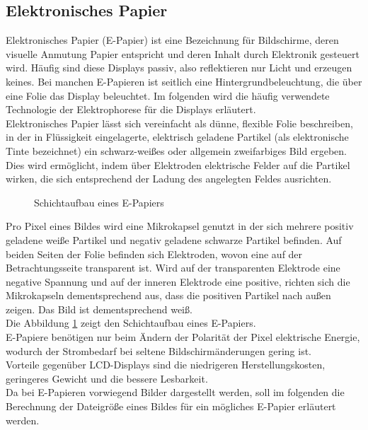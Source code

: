 \subsection{Elektronisches Papier}
Elektronisches Papier (E-Papier) ist eine Bezeichnung für Bildschirme, deren visuelle Anmutung Papier entspricht und deren Inhalt durch Elektronik gesteuert wird. Häufig sind diese Displays passiv, also reflektieren nur Licht und erzeugen keines. Bei manchen E-Papieren ist seitlich eine Hintergrundbeleuchtung, die über eine Folie das Display beleuchtet. Im folgenden wird die häufig verwendete Technologie der Elektrophorese für die Displays erläutert. \\
\glqq Elektronisches Papier lässt sich vereinfacht als dünne, flexible Folie beschreiben, in der in Flüssigkeit eingelagerte, elektrisch geladene Partikel (als elektronische Tinte bezeichnet) ein schwarz-weißes oder allgemein zweifarbiges Bild ergeben. Dies wird ermöglicht, indem über Elektroden elektrische Felder auf die Partikel wirken, die sich entsprechend der Ladung des angelegten Feldes ausrichten. \grqq{} \cite[Seite 568]{Schryen.2002} \\
\begin{figure}[hbt]
	\centering
	
	\caption[Schichtaufbau eines E-Papiers]{Schichtaufbau eines E-Papiers}
	\label{fig:epapier}
\end{figure}
Pro Pixel eines Bildes wird eine Mikrokapsel genutzt in der sich mehrere positiv geladene weiße Partikel und negativ geladene schwarze Partikel befinden. Auf beiden Seiten der Folie befinden sich Elektroden, wovon eine auf der Betrachtungsseite transparent ist. Wird auf der transparenten Elektrode eine negative Spannung und auf der inneren Elektrode eine positive, richten sich die Mikrokapseln dementsprechend aus, dass die positiven Partikel nach außen zeigen. Das Bild ist dementsprechend weiß. \cite[Vgl. Seite 567 f.]{Schryen.2002} \\
Die Abbildung \ref{fig:epapier} zeigt den Schichtaufbau eines E-Papiers.\\
E-Papiere benötigen nur beim Ändern der Polarität der Pixel elektrische Energie, wodurch der Strombedarf bei seltene Bildschirmänderungen gering ist. \\
Vorteile gegenüber LCD-Displays sind die niedrigeren Herstellungskosten, geringeres Gewicht und die bessere Lesbarkeit. \cite[Vgl. Seite 569]{Schryen.2002} \\
Da bei E-Papieren vorwiegend Bilder dargestellt werden, soll im folgenden die Berechnung der Dateigröße eines Bildes für ein mögliches E-Papier erläutert werden.
